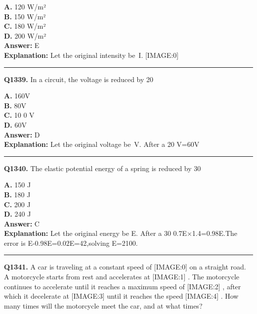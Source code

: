 \documentclass[12pt]{article}
\begin{document}
\textbf{A.} 120 W/m² \\
\textbf{B.} 150 W/m² \\
\textbf{C.} 180 W/m² \\
\textbf{D.} 200 W/m² \\

\textbf{Answer:} E \\
\textbf{Explanation:} Let the original intensity be I.
[IMAGE:0]

\hrule
\vspace{1em}


\noindent
\textbf{Q1339.} In a circuit, the voltage is reduced by 20%



\textbf{A.} 160V \\
\textbf{B.} 80V \\
\textbf{C.} 10
0
V \\
\textbf{D.} 60V \\

\textbf{Answer:} D \\
\textbf{Explanation:} Let the original voltage be V. After a 20%
V=60V

\hrule
\vspace{1em}


\noindent
\textbf{Q1340.} The elastic potential energy of a spring is reduced by 30%



\textbf{A.} 150 J \\
\textbf{B.} 180 J \\
\textbf{C.} 200 J \\
\textbf{D.} 240 J \\

\textbf{Answer:} C \\
\textbf{Explanation:} Let the original energy be E. After a 30%
0.7E×1.4=0.98E.The error is E-0.98E=0.02E=42,solving E=2100.

\hrule
\vspace{1em}


\noindent
\textbf{Q1341.} A car is traveling at a constant speed of
[IMAGE:0]
on a straight road. A motorcycle starts from rest and accelerates at
[IMAGE:1]
. The motorcycle continues to accelerate until it reaches a maximum speed of
[IMAGE:2]
, after which it decelerate at
[IMAGE:3]
until it reaches the speed
[IMAGE:4]
. How many times will the motorcycle meet the car, and at what times?
\end{document}
